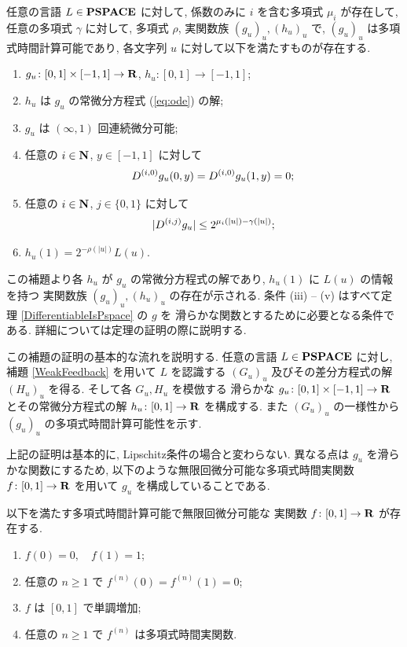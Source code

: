 \begin{lemma}
 \label{DifferentiableFamily}
 任意の言語 $L \in \mathbf{PSPACE}$ に対して, 
 係数のみに $i$ を含む多項式 $\mu_i$ が存在して,
 任意の多項式 $\gamma$ に対して,
 多項式 $\rho$, 実関数族 $(g_u)_u, (h_u)_u$ で, 
 $(g_u)_u$ は多項式時間計算可能であり,
 各文字列 $u$ に対して以下を満たすものが存在する.
 \begin{enumerate}
  \item $g_u\colon [0,1] \times [-1,1]\to \mathbf R$, $h_u\colon [0,1] \to [-1,1]$;
  \item $h_u$ は $g_u$ の常微分方程式 (\ref{eq:ode}) の解; 
  \item $g_u$ は $(\infty, 1)$ 回連続微分可能;
  \item 任意の $i \in \mathbf N$, $y \in [-1,1]$ に対して
	\begin{equation*}
	 D ^{(i, 0)} g_u(0,y) = D ^{(i, 0)} g_u(1,y) = 0;
	\end{equation*}
  \item \label{enum:infty1}
	任意の $i \in \mathbf N$, $j \in \{0,1\}$ に対して
	\begin{equation*}
	 |D ^{(i,j)} g_u| \leq 2^{\mu_i (|u|) - \gamma(|u|)};
	\end{equation*}
  \item $h_u(1) = 2^{-\rho(|u|)}L(u)$.
 \end{enumerate}
\end{lemma}

 この補題より各 $h_u$ が $g_u$ の常微分方程式の解であり, 
 $h_u(1)$ に $L(u)$ の情報を持つ
 実関数族 $(g_u)_u, (h_u)_u$ の存在が示される.
 条件 (iii) -- (v) はすべて定理 \ref{DifferentiableIsPspace} の $g$ を
 滑らかな関数とするために必要となる条件である.
 詳細については定理の証明の際に説明する.
 

 この補題の証明の基本的な流れを説明する.
 任意の言語 $L \in \mathbf{PSPACE}$ に対し, 
 補題 \ref{WeakFeedback} を用いて $L$ を認識する $(G_u)_u$ 
 及びその差分方程式の解 $(H_u)_u$ を得る.
 そして各 $G_u, H_u$ を模倣する
 滑らかな $g_u \colon [0,1] \times [-1, 1] \to \mathbf R$ 
 とその常微分方程式の解 $h_u \colon [0,1] \to \mathbf R$ を構成する.
 また $(G_u)_u$ の一様性から $(g_u)_u$ の多項式時間計算可能性を示す.


 上記の証明は基本的に, Lipschitz条件の場合と変わらない.
 異なる点は $g_u$ を滑らかな関数にするため, 
 以下のような無限回微分可能な多項式時間実関数 $f \colon [0,1] \to \mathbf R$ を用いて
 $g_u$ を構成していることである.

 \begin{lemma}
  \label{SmoothFunction}
  以下を満たす多項式時間計算可能で無限回微分可能な
  実関数 $f \colon [0,1] \to \mathbf R$ が存在する.
  \begin{enumerate}
   \item $f(0) = 0, \quad f(1) = 1$;
   \item 任意の $n \ge 1$ で $f^{(n)}(0) = f^{(n)}(1) = 0$;
   \item $f$ は $[0,1]$ で単調増加;
   \item 任意の $n \ge 1$ で $f^{(n)}$ は多項式時間実関数.
  \end{enumerate}
 \end{lemma} 


